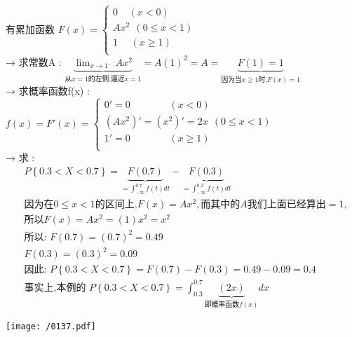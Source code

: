 \documentclass[UTF8]{ctexart}
\begin{document}
\begin{myEnvSample}
有累加函数 $F\left( x \right) =\left\{ \begin{array}{l}
	0\ \ \ \ \ \left( x<0 \right)\\
	Ax^2\ \ \left( 0\leq x<1 \right)\\
	1\ \ \ \ \ \ \left( x\geq 1 \right)\\
\end{array} \right. $ \\

→ 求常数A :  
$
\underset{\text{从}x=1\text{的左侧,逼近}x=1}{\underbrace{\lim_{x\rightarrow 1^-}Ax^2}}=A\left( 1 \right) ^2=A=\underset{\text{因为当}x\geq 1\text{时,}F\left( x \right) =1}{\underbrace{F\left( 1 \right) =1}}
$ \\

→ 求概率函数f(x) : 
$
f\left( x \right) =F'\left( x \right) =\left\{ \begin{array}{l}
	0'=0\ \ \ \ \ \ \ \ \ \ \ \ \ \ \ \ \ \ \left( x<0 \right)\\
	\left( Ax^2 \right) '=\left( x^2 \right) '=2x\ \ \left( 0\leq x<1 \right)\\
	1'=0\ \ \ \ \ \ \ \ \ \ \ \ \ \ \ \ \ \ \left( x\geq 1 \right)\\
\end{array} \right. 
$ \\

→ 求 :
\begin{align*}  %
	&P\left\{ 0.3<X<0.7 \right\} =\underset{=\int_{-\infty}^{0.7}{f\left( t \right)}dt}{\underbrace{F\left( 0.7 \right) }}-\underset{=\int_{-\infty}^{0.3}{f\left( t \right)}dt}{\underbrace{F\left( 0.3 \right) }}\\
&\text{因为在}0\leq x<1\text{的区间上,}F\left( x \right) =Ax^2,\text{而其中的}A\text{我们上面已经算出}=1,\\
&\text{所以}F\left( x \right) =Ax^2=\left( 1 \right) x^2=x^2\\
&\text{所以:\ }F\left( 0.7 \right) =\left( 0.7 \right) ^2=0.49\\
&F\left( 0.3 \right) =\left( 0.3 \right) ^2=0.09\\
&\text{因此:\ }P\left\{ 0.3<X<0.7 \right\} =F\left( 0.7 \right) -F\left( 0.3 \right) =0.49-0.09=0.4\\
&\text{事实上,本例的\ }P\left\{ 0.3<X<0.7 \right\} =\int_{0.3}^{0.7}{\underset{\text{即概率函数}f\left( x \right)}{\underbrace{\left( 2x \right) }}}dx  
\end{align*}

\texttt{[image: /0137.pdf]}

\end{myEnvSample}
\end{document}
